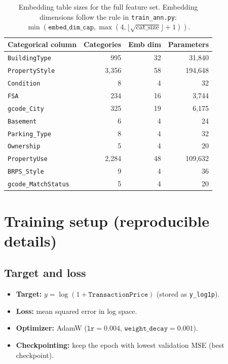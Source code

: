 \documentclass[11pt]{article}
\newcommand{\AnnLR}{0.004}
\newcommand{\AnnWD}{0.001}
\begin{document}
\begin{table}[h]
\centering
\small
\begin{tabular}{@{}lrrr@{}}
\toprule
Categorical column & Categories & Emb dim & Parameters \\
\midrule
\texttt{BuildingType} & 995 & 32 & 31{,}840 \\
\texttt{PropertyStyle} & 3{,}356 & 58 & 194{,}648 \\
\texttt{Condition} & 8 & 4 & 32 \\
\texttt{FSA} & 234 & 16 & 3{,}744 \\
\texttt{gcode\_City} & 325 & 19 & 6{,}175 \\
\texttt{Basement} & 6 & 4 & 24 \\
\texttt{Parking\_Type} & 8 & 4 & 32 \\
\texttt{Ownership} & 5 & 4 & 20 \\
\texttt{PropertyUse} & 2{,}284 & 48 & 109{,}632 \\
\texttt{BRPS\_Style} & 9 & 4 & 36 \\
\texttt{gcode\_MatchStatus} & 5 & 4 & 20 \\
\bottomrule
\end{tabular}
\caption{Embedding table sizes for the full feature set. Embedding dimensions follow the rule in \texttt{train\_ann.py}: \(\min(\texttt{embed\_dim\_cap},\max(4,\lfloor \sqrt{\text{cat\_size}}\rfloor + 1))\).}
\label{tab:ann-embeddings}
\end{table}

\section{Training setup (reproducible details)}
\subsection{Target and loss}
\begin{itemize}[leftmargin=*]
  \item \textbf{Target:} \(y=\log(1+\texttt{TransactionPrice})\) (stored as \texttt{y\_log1p}).
  \item \textbf{Loss:} mean squared error in log space.
  \item \textbf{Optimizer:} AdamW (\(\texttt{lr}=\AnnLR\), \(\texttt{weight\_decay}=\AnnWD\)).
  \item \textbf{Checkpointing:} keep the epoch with lowest validation MSE (best checkpoint).
\end{itemize}
\end{document}
